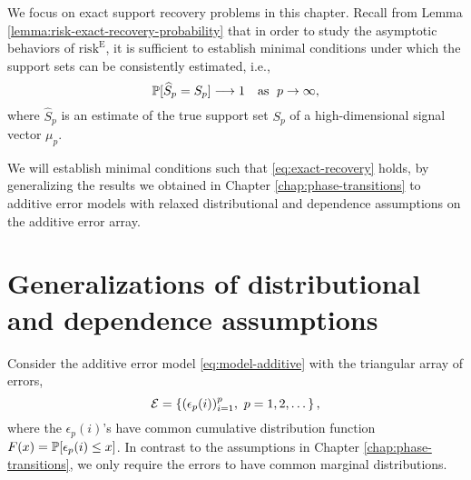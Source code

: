 
We focus on exact support recovery problems in this chapter.
Recall from Lemma \ref{lemma:risk-exact-recovery-probability} that in order to study the asymptotic behaviors of $\mathrm{risk}^{\mathrm{E}}$, it is sufficient to establish minimal conditions under which the support sets can be consistently estimated, i.e.,
\begin{equation} \label{eq:exact-recovery} 
\P[\widehat{S}_p = S_p] \longrightarrow 1 \quad \text{as } \; p\to\infty, 
\end{equation}
where $\widehat{S}_p$ is an estimate of the true support set $S_p$ of a high-dimensional signal vector $\mu_p$.

We will establish minimal conditions such that \eqref{eq:exact-recovery} holds, by generalizing the results we obtained in Chapter \ref{chap:phase-transitions} to additive error models with relaxed distributional and dependence assumptions on the additive error array.



\section{Generalizations of distributional and dependence assumptions}
Consider the additive error model \eqref{eq:model-additive} with the triangular array of errors,
\begin{equation} \label{eq:error-array}
    {\cal E} = \left\{ (\epsilon_p(i))_{i=1}^p,\ p=1,2,\dots\right\},
\end{equation}
where the $\epsilon_p(i)$'s have common cumulative distribution function $F(x)=\P[\epsilon_p(i)\le x]$.
In contrast to the assumptions in Chapter \ref{chap:phase-transitions}, we only require the errors to have common marginal distributions.


